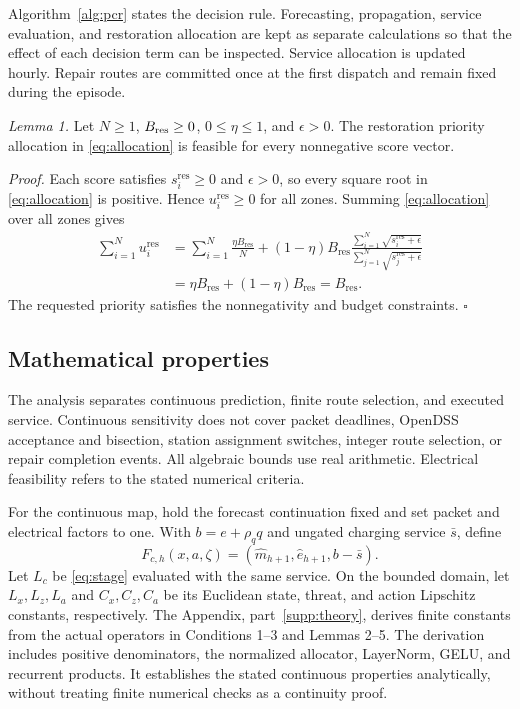 \documentclass[journal]{IEEEtran}
\begin{document}
Algorithm~\ref{alg:pcr} states the decision rule.  Forecasting, propagation,
service evaluation, and restoration allocation are kept as separate calculations
so that the effect of each decision term can be inspected.  Service allocation
is updated hourly.  Repair routes are committed once at the first dispatch and
remain fixed during the episode.

\textit{Lemma 1.}  Let $N\ge1$, $B_{\rm res}\ge0$, $0\le\eta\le1$, and
$\epsilon>0$.  The restoration priority allocation in \eqref{eq:allocation}
is feasible for every nonnegative score vector.

\textit{Proof.}  Each score satisfies $s_i^{\mathrm{res}}\ge0$ and
$\epsilon>0$, so every square root in \eqref{eq:allocation} is positive.  Hence
$u_i^{\mathrm{res}}\ge0$ for all zones.  Summing \eqref{eq:allocation} over all
zones gives
\begin{align}
\sum_{i=1}^{N}u_i^{\mathrm{res}}
&=\sum_{i=1}^{N}\frac{\eta B_{\mathrm{res}}}{N}
+(1-\eta)B_{\mathrm{res}}
\frac{\sum_{i=1}^{N}\sqrt{s_i^{\mathrm{res}}+\epsilon}}
{\sum_{j=1}^{N}\sqrt{s_j^{\mathrm{res}}+\epsilon}} \nonumber\\
&=\eta B_{\mathrm{res}}+(1-\eta)B_{\mathrm{res}}
=B_{\mathrm{res}}.
\end{align}
The requested priority satisfies the nonnegativity and budget constraints.  \hfill
$\square$

\subsection{Mathematical properties}
\label{sec:theory}

The analysis separates continuous prediction, finite route selection, and
executed service.  Continuous sensitivity does not cover packet deadlines,
OpenDSS acceptance and bisection, station assignment switches, integer route
selection, or repair completion events.  All algebraic bounds use real
arithmetic.  Electrical feasibility refers to the stated numerical criteria.

For the continuous map, hold the forecast continuation fixed and set packet
and electrical factors to one.  With $b=e+\rho_q q$ and ungated charging
service $\bar s$, define
\begin{equation}
F_{c,h}(x,a,\zeta)=(\hat m_{h+1},\hat e_{h+1},b-\bar s).
\label{eq:continuous-service}
\end{equation}
Let $L_c$ be \eqref{eq:stage} evaluated with the same service.
On the bounded domain, let $L_x,L_z,L_a$ and $C_x,C_z,C_a$ be its
Euclidean state, threat, and action Lipschitz constants, respectively.
The Appendix, part~\ref{supp:theory}, derives finite constants from the
actual operators in Conditions 1--3 and Lemmas 2--5.
The derivation includes positive denominators, the normalized allocator,
LayerNorm, GELU, and recurrent products.  It establishes the stated
continuous properties analytically, without treating finite numerical
checks as a continuity proof.
\end{document}
